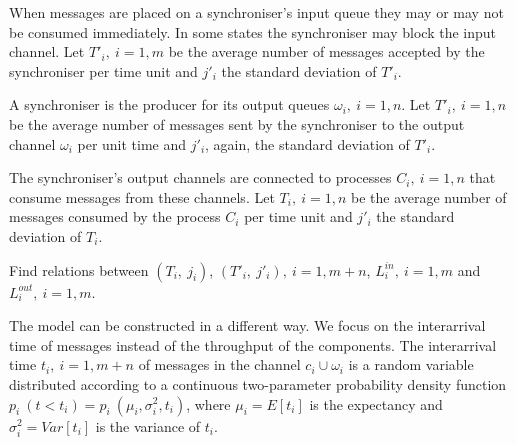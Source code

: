 When messages are placed on a synchroniser's input queue they may or may not be consumed immediately. In some states the synchroniser may block the input channel. Let $T'_{i}, \: i=1,m$ be the average number of messages accepted by the synchroniser per time unit and $j'_{i}$ the standard deviation of $T'_{i}$.

A synchroniser is the producer for its output queues $\omega_{i}, \: i=1,n$. Let $T'_{i}, \: i=1,n$ be the average number of messages sent by the synchroniser to the output channel $\omega_{i}$ per unit time and $j'_{i}$, again, the standard deviation of $T'_{i}$.

The synchroniser's output channels are connected to processes $C_{i}, \: i=1,n$ that consume messages from these channels. Let $T_{i}, \: i=1,n$ be the average number of messages consumed by the process $C_{i}$ per time unit and $j'_{i}$ the standard deviation of $T_{i}$.

\begin{problem}Find relations between $(T_{i}, \: j_{i})$, $(T'_{i}, \: j'_{i}), \: i=1,m+n$, $L^{in}_{i}, \: i=1,m$ and $L^{out}_{i}, \: i=1,m$.
\end{problem}

The model can be constructed in a different way. We focus on the interarrival time of messages instead of the throughput of the components. The interarrival time $t_{i}, \: i=1,m+n$ of messages in the channel $c_{i} \cup \omega_{i}$ is a random variable distributed according to a continuous two-parameter probability density function $p_{i} \: (t < t_{i}) = p_{i} \: (\mu_{i}, \sigma^2_{i}, t_{i})$, where $\mu_{i} = E[t_{i}]$ is the expectancy and $\sigma^2_{i} = Var[t_{i}]$ is the variance of $t_{i}$.


